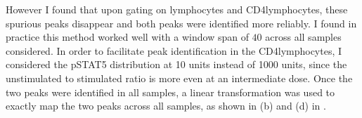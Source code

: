However I found that upon gating on lymphocytes and CD4\positive lymphocytes, these spurious peaks disappear and both peaks were identified more reliably.
I found in practice this method worked well with a window span of $40$ across all samples considered.
In order to facilitate peak identification in the CD4\positive lymphocytes, I considered the pSTAT5 distribution at 10 units instead of 1000 units, since the unstimulated to stimulated ratio is more even at an intermediate dose.
Once the two peaks were identified in all samples, a linear transformation was used to exactly map the two peaks across all samples, as shown in (b) and (d) in .
